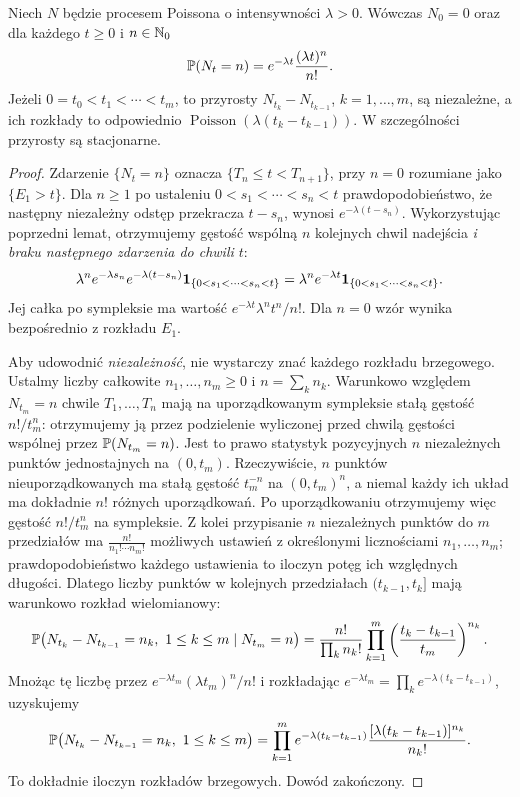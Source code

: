 \begin{twierdzenie}
\label{thm:poisson-fdd}
Niech $N$ będzie procesem Poissona o intensywności $\lambda>0$.
Wówczas $N_0=0$ oraz dla każdego $t\ge0$ i $n\in\mathbb{N}_0$
\[
\mathbb{P}(N_t=n)=e^{-\lambda t}\frac{(\lambda t)^n}{n!}.
\]
Jeżeli $0=t_0<t_1<\cdots<t_m$, to przyrosty
$N_{t_k}-N_{t_{k-1}}$, $k=1,\ldots,m$, są niezależne, a ich
rozkłady to odpowiednio
$\operatorname{Poisson}(\lambda(t_k-t_{k-1}))$.
W szczególności przyrosty są stacjonarne.
\end{twierdzenie}
\begin{proof}
Zdarzenie $\{N_t=n\}$ oznacza $\{T_n\le t<T_{n+1}\}$,
przy $n=0$ rozumiane jako $\{E_1>t\}$.
Dla $n\ge1$ po ustaleniu $0<s_1<\cdots<s_n<t$ prawdopodobieństwo,
że następny niezależny odstęp przekracza $t-s_n$, wynosi
$e^{-\lambda(t-s_n)}$. Wykorzystując poprzedni lemat, otrzymujemy
gęstość wspólną $n$ kolejnych chwil nadejścia \emph{i braku następnego
zdarzenia do chwili $t$}:
\[
\lambda^n e^{-\lambda s_n}e^{-\lambda(t-s_n)}
\mathbf{1}_{\{0<s_1<\cdots<s_n<t\}}
=\lambda^n e^{-\lambda t}\mathbf{1}_{\{0<s_1<\cdots<s_n<t\}}.
\]
Jej całka po sympleksie ma wartość
$e^{-\lambda t}\lambda^n t^n/n!$. Dla $n=0$ wzór wynika
bezpośrednio z rozkładu $E_1$.

Aby udowodnić \emph{niezależność}, nie wystarczy znać każdego
rozkładu brzegowego. Ustalmy liczby całkowite $n_1,\ldots,n_m\ge0$
i $n=\sum_k n_k$. Warunkowo względem $N_{t_m}=n$ chwile
$T_1,\ldots,T_n$ mają na uporządkowanym sympleksie stałą gęstość
$n!/t_m^n$: otrzymujemy ją przez podzielenie wyliczonej przed chwilą
gęstości wspólnej przez $\mathbb{P}(N_{t_m}=n)$.
Jest to prawo statystyk pozycyjnych $n$ niezależnych punktów
jednostajnych na $(0,t_m)$. Rzeczywiście, $n$ punktów
nieuporządkowanych ma stałą gęstość $t_m^{-n}$ na
$(0,t_m)^n$, a niemal każdy ich układ ma dokładnie $n!$
różnych uporządkowań. Po uporządkowaniu otrzymujemy więc
gęstość $n!/t_m^n$ na sympleksie. Z kolei przypisanie
$n$ niezależnych punktów do $m$ przedziałów ma
$\frac{n!}{n_1!\cdots n_m!}$ możliwych ustawień
z określonymi licznościami $n_1,\ldots,n_m$; prawdopodobieństwo
każdego ustawienia to iloczyn potęg ich względnych długości.
Dlatego liczby punktów w kolejnych
przedziałach $(t_{k-1},t_k]$ mają warunkowo rozkład wielomianowy:
\[
\mathbb{P}\bigl(N_{t_k}-N_{t_{k-1}}=n_k,\ 1\le k\le m
 \mid N_{t_m}=n\bigr)
=\frac{n!}{\prod_k n_k!}\prod_{k=1}^m
 \left(\frac{t_k-t_{k-1}}{t_m}\right)^{n_k}.
\]
Mnożąc tę liczbę przez $e^{-\lambda t_m}(\lambda t_m)^n/n!$
i rozkładając $e^{-\lambda t_m}=\prod_k e^{-\lambda(t_k-t_{k-1})}$,
uzyskujemy
\[
\mathbb{P}\bigl(N_{t_k}-N_{t_{k-1}}=n_k,\ 1\le k\le m\bigr)
=\prod_{k=1}^m e^{-\lambda(t_k-t_{k-1})}
  \frac{[\lambda(t_k-t_{k-1})]^{n_k}}{n_k!}.
\]
To dokładnie iloczyn rozkładów brzegowych. Dowód zakończony.
\end{proof}


